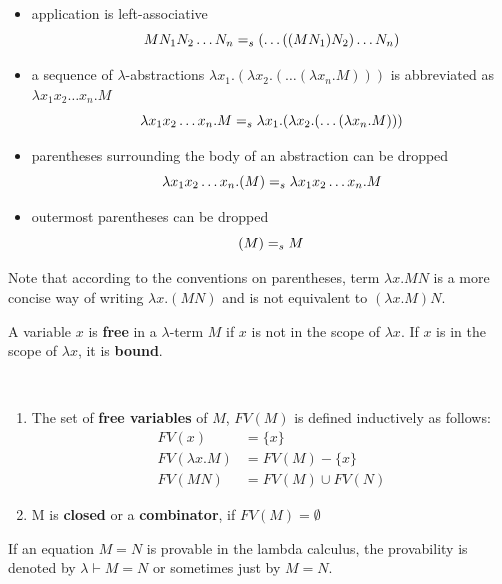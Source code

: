 \begin{remark} \label{rem:parcon}
\begin{itemize}
\item application is left-associative
$$MN_1 N_2 \dots N_n =_s (\dots ( (MN_1) N_2 ) \dots N_n)$$
\item  a sequence of $\lambda$-abstractions $\lambda x_1. (\lambda x_2. ( \dots (\lambda x_n. M) )  ) $ is abbreviated as \\ $\lambda x_1 x_2 \dots x_n.M$
$$\lambda x_1 x_2 \dots x_n.M =_s \lambda x_1. (\lambda x_2. ( \dots (\lambda x_n. M) )  )  $$
\item parentheses surrounding the body of an abstraction can be dropped
$$\lambda x_1 x_2 \dots x_n.(M) =_s \lambda x_1 x_2 \dots x_n.M$$
\item outermost parentheses can be dropped 
$$(M) =_s M$$
\end{itemize}
\end{remark}
Note that according to the conventions on parentheses, term $\lambda x. MN$ is a more concise way of writing $\lambda x. (MN)$ and is not equivalent to $(\lambda x. M)N$. 

\begin{definition} A variable $x$ is \textbf{free} in a $\lambda$-term $M$ if $x$ is not in the scope of $\lambda x$. If $x$ is in the scope of $\lambda x$, it is \textbf{bound}.
\end{definition}

\begin{definition} \ 
\begin{enumerate}
\item The set of \textbf{free variables} of $M$, $FV(M)$ is defined inductively as follows:
\begin{align*}
 FV(x)  & = \{ x \} \\
 FV(\lambda x.M)  & = FV(M) - \{ x \} \\
 FV(MN)  & = FV(M) \cup FV(N)
\end{align*}
\item M is \textbf{closed} or a \textbf{combinator}, if $FV(M) = \emptyset$

\end{enumerate}
\end{definition}

If an equation $M=N$ is provable in the lambda calculus, the provability is denoted by $\lambda \vdash M = N$
or sometimes just by $M=N$.

